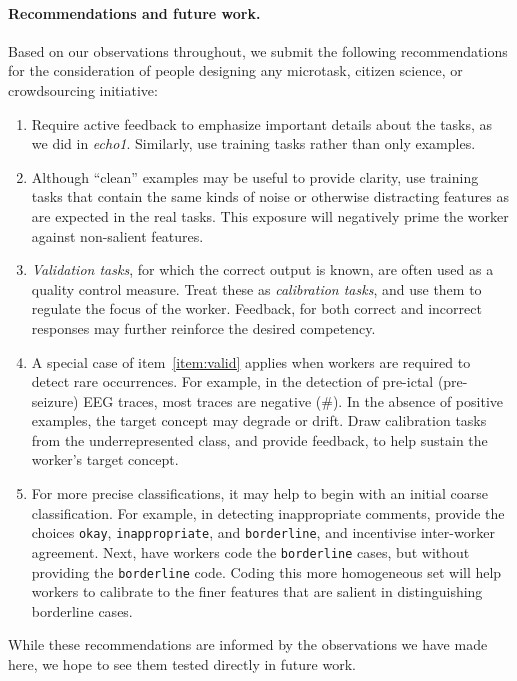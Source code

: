 \documentclass[12pt]{article}
\begin{document}
\paragraph{Recommendations and future work.} 
Based on our observations throughout, we submit the following 
recommendations for the consideration of people designing 
any microtask, citizen science, or crowdsourcing initiative:
\begin{enumerate}
	\item{
		Require active feedback to emphasize important details about the 
		tasks, as we did in \textit{echo1}.  Similarly, use training tasks 
		rather than only examples.
	}
	\item{
		Although ``clean'' examples may be useful to provide clarity,
		use training tasks that contain the same kinds of noise or otherwise
		distracting features as are expected in the real tasks.
		This exposure will negatively prime the worker against non-salient 
		features.
	}
	\item{
		\textit{Validation tasks}, for which the correct output is known,
		are often used as a quality control measure.
		Treat these as \textit{calibration tasks}, and use them to regulate
		the focus of the worker.
		Feedback, for both correct and incorrect responses may further 
		reinforce the desired competency. \label{item:valid}
	}
	\item{
		A special case of item~\ref{item:valid} applies when workers are 
		required to detect rare occurrences.
		For example, in the detection of pre-ictal (pre-seizure) EEG traces, 
		most traces are negative (\#).  In the absence of positive 
		examples, the target concept may degrade or drift.
		Draw calibration tasks from the underrepresented class,
		and provide feedback, to help sustain the worker's target concept.
	}
	\item{
		For more precise classifications, it may help to begin with
		an initial coarse classification.  For example, in detecting 
		inappropriate comments, provide the choices   
		\texttt{okay}, \texttt{inappropriate}, and \texttt{borderline},
		and incentivise inter-worker agreement.  Next, have workers 
		code the \texttt{borderline} cases, but without providing the
		\texttt{borderline} code.  Coding this more homogeneous
		set will help workers to calibrate to the finer features that are 
		salient in distinguishing borderline cases.
	}
\end{enumerate}

While these recommendations are informed by the observations we have made 
here, we hope to see them tested directly in future work.
\end{document}
